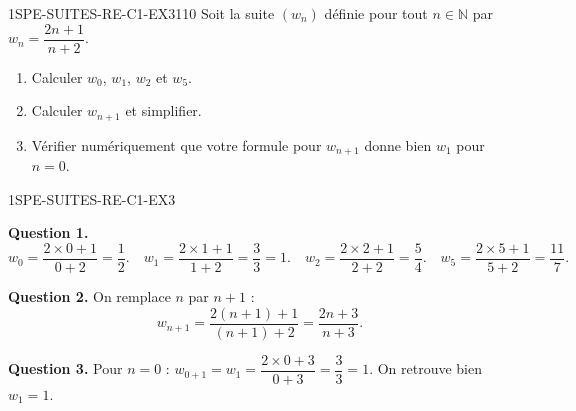 \begin{exercice}{1SPE-SUITES-RE-C1-EX3}{1}{10}
Soit la suite $(w_n)$ définie pour tout $n \in \mathbb{N}$ par $w_n = \dfrac{2n + 1}{n + 2}$.
\begin{enumerate}
  \item Calculer $w_0$, $w_1$, $w_2$ et $w_5$.
  \item Calculer $w_{n+1}$ et simplifier.
  \item Vérifier numériquement que votre formule pour $w_{n+1}$ donne bien $w_1$ pour $n = 0$.
\end{enumerate}
\end{exercice}


\begin{corrige}{1SPE-SUITES-RE-C1-EX3}

\textbf{Question 1.}
\[
w_0 = \frac{2 \times 0 + 1}{0 + 2} = \frac{1}{2}. \quad
w_1 = \frac{2 \times 1 + 1}{1 + 2} = \frac{3}{3} = 1. \quad
w_2 = \frac{2 \times 2 + 1}{2 + 2} = \frac{5}{4}. \quad
w_5 = \frac{2 \times 5 + 1}{5 + 2} = \frac{11}{7}.
\]

\textbf{Question 2.} On remplace $n$ par $n+1$ :
\[
w_{n+1} = \frac{2(n+1)+1}{(n+1)+2} = \frac{2n+3}{n+3}.
\]

\textbf{Question 3.} Pour $n = 0$ : $w_{0+1} = w_1 = \dfrac{2 \times 0 + 3}{0 + 3} = \dfrac{3}{3} = 1$. On retrouve bien $w_1 = 1$. \checkmark

\end{corrige}
